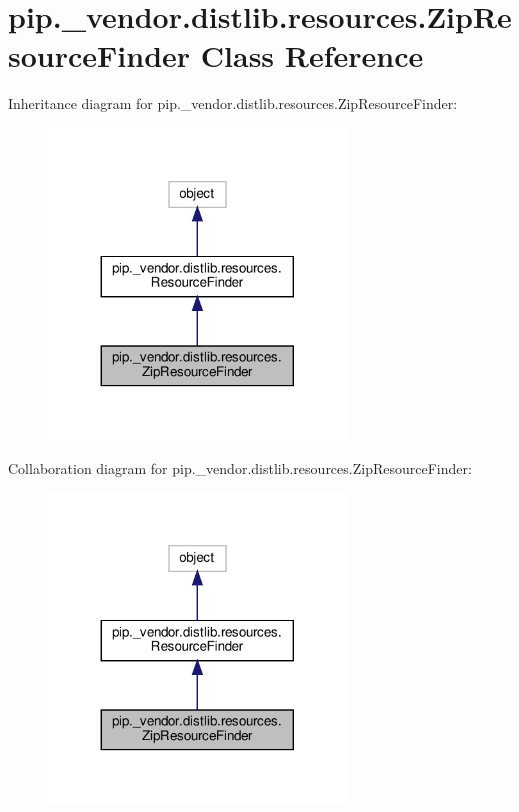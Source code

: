 \hypertarget{classpip_1_1__vendor_1_1distlib_1_1resources_1_1ZipResourceFinder}{}\section{pip.\+\_\+vendor.\+distlib.\+resources.\+Zip\+Resource\+Finder Class Reference}
\label{classpip_1_1__vendor_1_1distlib_1_1resources_1_1ZipResourceFinder}


Inheritance diagram for pip.\+\_\+vendor.\+distlib.\+resources.\+Zip\+Resource\+Finder\+:
\nopagebreak
\begin{figure}[H]
\begin{center}
\leavevmode
\includegraphics[width=224pt]{classpip_1_1__vendor_1_1distlib_1_1resources_1_1ZipResourceFinder__inherit__graph}
\end{center}
\end{figure}


Collaboration diagram for pip.\+\_\+vendor.\+distlib.\+resources.\+Zip\+Resource\+Finder\+:
\nopagebreak
\begin{figure}[H]
\begin{center}
\leavevmode
\includegraphics[width=224pt]{classpip_1_1__vendor_1_1distlib_1_1resources_1_1ZipResourceFinder__coll__graph}
\end{center}
\end{figure}

